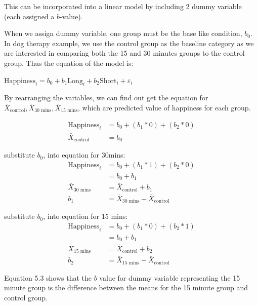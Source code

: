 This can be incorporated into a linear model by including 2 dummy variable (each assigned a $b$-value).

When we assign dummy variable, one group must be the base like condition, $b_0$. In dog therapy example, we use the control group as the baseline category as we are interested in comparing both the 15 and 30 minutes groups to the control group. Thus the equation of the model is:

\begin{center}
$\text{Happiness}_i = b_0 + b_1\text{Long}_i + b_2\text{Short}_i + \varepsilon_i$
\end{center}


By rearranging the variables, we can find out get the equation for $\bar{X}_{\text{control}},\bar{X}_{\text{30 mins}},\bar{X}_{\text{15 mins}}$, which are predicted value of happiness for each group. 

\begin{equation}
\begin{split}
\text{Happiness}_i & = b_0 + (b_1 * 0) + (b_2 * 0)   \\
\bar{X}_{\text{control}} & = b_0
\end{split}
\end{equation}

substitute $b_0$, into equation for 30mins:
\begin{equation}
\begin{split}
\text{Happiness}_i & = b_0 + (b_1 * 1) +  (b_2 * 0)   \\
& = b_0 + b_1 \\
\bar{X}_{\text{30 mins}} & = \bar{X}_{\text{control}} + b_1 \\
b_1 & = \bar{X}_{\text{30 mins}} - \bar{X}_{\text{control}} 
\end{split}
\end{equation}

substitute $b_0$, into equation for 15 mins:
\begin{equation}
\begin{split}
\text{Happiness}_i & = b_0 + (b_1 * 0) +  (b_2 * 1)   \\
& = b_0 + b_1 \\
\bar{X}_{\text{15 mins}} & = \bar{X}_{\text{control}} + b_2 \\
b_2& = \bar{X}_{\text{15 mins}} - \bar{X}_{\text{control}} 
\end{split}
\end{equation}

Equation 5.3 shows that the $b$ value for dummy variable representing the 15 minute group is the difference between the means for the 15 minute group and control group.

